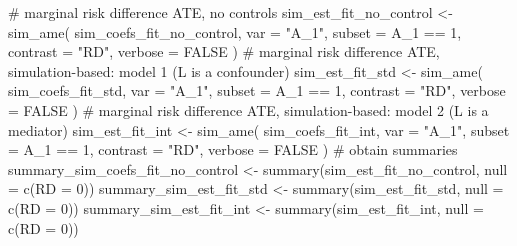\documentclass[
  singlecolumn]{article}
\newenvironment{Shaded}{}{}
\newcommand{\AttributeTok}[1]{\textcolor[rgb]{0.84,0.23,0.29}{#1}}
\newcommand{\CommentTok}[1]{\textcolor[rgb]{0.42,0.45,0.49}{#1}}
\newcommand{\ConstantTok}[1]{\textcolor[rgb]{0.00,0.36,0.77}{#1}}
\newcommand{\DecValTok}[1]{\textcolor[rgb]{0.00,0.36,0.77}{#1}}
\newcommand{\FunctionTok}[1]{\textcolor[rgb]{0.44,0.26,0.76}{#1}}
\newcommand{\NormalTok}[1]{\textcolor[rgb]{0.14,0.16,0.18}{#1}}
\newcommand{\OtherTok}[1]{\textcolor[rgb]{0.44,0.26,0.76}{#1}}
\newcommand{\SpecialCharTok}[1]{\textcolor[rgb]{0.00,0.36,0.77}{#1}}
\newcommand{\StringTok}[1]{\textcolor[rgb]{0.01,0.18,0.38}{#1}}
\begin{document}
\begin{Shaded}
\begin{Highlighting}[]
\CommentTok{\# marginal risk difference ATE, no controls}
\NormalTok{sim\_est\_fit\_no\_control }\OtherTok{\textless{}{-}}
  \FunctionTok{sim\_ame}\NormalTok{(}
\NormalTok{    sim\_coefs\_fit\_no\_control,}
    \AttributeTok{var =} \StringTok{"A\_1"}\NormalTok{,}
    \AttributeTok{subset =}\NormalTok{ A\_1 }\SpecialCharTok{==} \DecValTok{1}\NormalTok{,}
    \AttributeTok{contrast =} \StringTok{"RD"}\NormalTok{,}
    \AttributeTok{verbose =} \ConstantTok{FALSE}
\NormalTok{  )}
\CommentTok{\# marginal risk difference ATE, simulation{-}based: model 1 (L is a confounder)}
\NormalTok{sim\_est\_fit\_std }\OtherTok{\textless{}{-}}
  \FunctionTok{sim\_ame}\NormalTok{(}
\NormalTok{    sim\_coefs\_fit\_std,}
    \AttributeTok{var =} \StringTok{"A\_1"}\NormalTok{,}
    \AttributeTok{subset =}\NormalTok{ A\_1 }\SpecialCharTok{==} \DecValTok{1}\NormalTok{,}
    \AttributeTok{contrast =} \StringTok{"RD"}\NormalTok{,}
    \AttributeTok{verbose =} \ConstantTok{FALSE}
\NormalTok{  )}
\CommentTok{\# marginal risk difference ATE, simulation{-}based: model 2 (L is a mediator)}
\NormalTok{sim\_est\_fit\_int }\OtherTok{\textless{}{-}}
  \FunctionTok{sim\_ame}\NormalTok{(}
\NormalTok{    sim\_coefs\_fit\_int,}
    \AttributeTok{var =} \StringTok{"A\_1"}\NormalTok{,}
    \AttributeTok{subset =}\NormalTok{ A\_1 }\SpecialCharTok{==} \DecValTok{1}\NormalTok{,}
    \AttributeTok{contrast =} \StringTok{"RD"}\NormalTok{,}
    \AttributeTok{verbose =} \ConstantTok{FALSE}
\NormalTok{  )}
\CommentTok{\# obtain summaries}
\NormalTok{summary\_sim\_coefs\_fit\_no\_control }\OtherTok{\textless{}{-}}
  \FunctionTok{summary}\NormalTok{(sim\_est\_fit\_no\_control, }\AttributeTok{null =} \FunctionTok{c}\NormalTok{(}\StringTok{\textasciigrave{}}\AttributeTok{RD}\StringTok{\textasciigrave{}} \OtherTok{=} \DecValTok{0}\NormalTok{))}
\NormalTok{summary\_sim\_est\_fit\_std }\OtherTok{\textless{}{-}}
  \FunctionTok{summary}\NormalTok{(sim\_est\_fit\_std, }\AttributeTok{null =} \FunctionTok{c}\NormalTok{(}\StringTok{\textasciigrave{}}\AttributeTok{RD}\StringTok{\textasciigrave{}} \OtherTok{=} \DecValTok{0}\NormalTok{))}
\NormalTok{summary\_sim\_est\_fit\_int }\OtherTok{\textless{}{-}}
  \FunctionTok{summary}\NormalTok{(sim\_est\_fit\_int, }\AttributeTok{null =} \FunctionTok{c}\NormalTok{(}\StringTok{\textasciigrave{}}\AttributeTok{RD}\StringTok{\textasciigrave{}} \OtherTok{=} \DecValTok{0}\NormalTok{))}


\end{Highlighting}
\end{Shaded}
\end{document}
